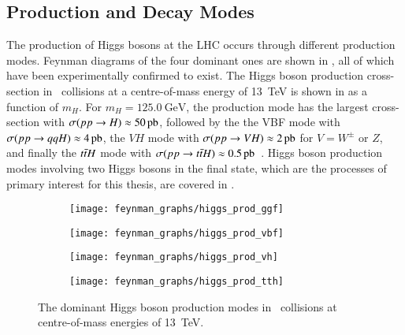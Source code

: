 \subsection{Production and Decay Modes}

The production of Higgs bosons at the LHC occurs through different production
modes. Feynman diagrams of the four dominant ones are shown in
, all of which have been experimentally confirmed to
exist. The Higgs boson production cross-section in \pp~collisions at a
centre-of-mass energy of \SI{13}{\TeV} is shown in  as
a function of $m_{H}$. For $m_{H} = \SI{125.0}{\GeV}$, the \ggF production mode
has the largest cross-section with
$\sigma(\pp \to H) \approx \SI{50}{\pico\barn}$, followed by the the VBF mode
with $\sigma(\pp \to qqH) \approx \SI{4}{\pico\barn}$, the $VH$ mode with
$\sigma(\pp \to VH) \approx \SI{2}{\pico\barn}$ for $V = W^\pm$ or $Z$, and
finally the $t\bar{t} H$ mode with
$\sigma(\pp \to \ttbar H) \approx
\SI{0.5}{\pico\barn}$~\cite{deFlorian:2016spz}.
Higgs boson production modes involving two Higgs bosons in the final state,
which are the processes of primary interest for this thesis, are covered in
.

\begin{figure}[htbp]
  \centering

  \begin{subfigure}{0.48\textwidth}
    \centering
    \texttt{[image: feynman\_graphs/higgs\_prod\_ggf]}
  \end{subfigure}%
  \begin{subfigure}{0.48\textwidth}
    \centering
    \texttt{[image: feynman\_graphs/higgs\_prod\_vbf]}
  \end{subfigure}

  \vspace*{0.5em}

  \begin{subfigure}{0.48\textwidth}
    \centering
    \texttt{[image: feynman\_graphs/higgs\_prod\_vh]}
  \end{subfigure}%
  \begin{subfigure}{0.48\textwidth}
    \centering
    \texttt{[image: feynman\_graphs/higgs\_prod\_tth]}
  \end{subfigure}%

  \caption{The dominant Higgs boson production modes in \pp~collisions at
    centre-of-mass energies of \SI{13}{\TeV}.}%
  \label{fig:higgs_prod_feyn}
\end{figure}

